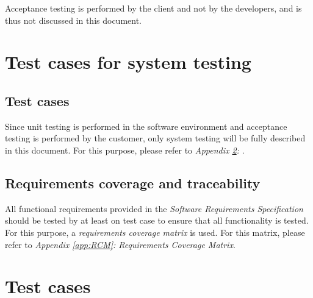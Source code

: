 \documentclass[12pt,titlepage]{article}
\begin{document}
Acceptance testing is performed by the client and not by the developers, and is
thus not discussed in this document.



\section{Test cases for system testing}
\label{sec:test-cases-for-system-testing}

\subsection{Test cases}
\label{subsec:test-cases}

Since unit testing is performed in the software environment and acceptance
testing is performed by the customer, only system testing will be fully
described in this document. For this purpose, please refer to
\textit{Appendix \ref{app:test-cases}: }.

\subsection{Requirements coverage and traceability}
\label{subsec:requirements-coverage-and-testability}

All functional requirements provided in the \textit{Software Requirements
Specification} should be tested by at least on test case to ensure that all
functionality is tested. For this purpose, a \textit{requirements coverage
matrix} is used. For this matrix, please refer to \textit{Appendix
\ref{app:RCM}: Requirements Coverage Matrix}.



\newpage
\appendix

\section{Test cases}
\label{app:test-cases}

\begin{usecase}
\end{usecase}
\end{document}
